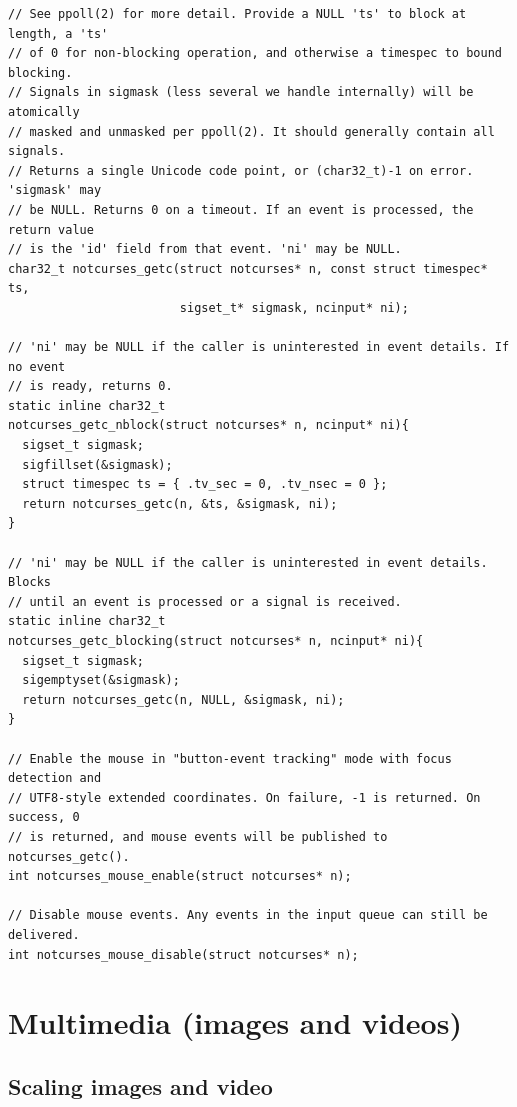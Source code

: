 \documentclass[letterpaper,10pt]{article}
\begin{document}
\begin{listing}[!htbp]
\begin{verbatim}
// See ppoll(2) for more detail. Provide a NULL 'ts' to block at length, a 'ts'
// of 0 for non-blocking operation, and otherwise a timespec to bound blocking.
// Signals in sigmask (less several we handle internally) will be atomically
// masked and unmasked per ppoll(2). It should generally contain all signals.
// Returns a single Unicode code point, or (char32_t)-1 on error. 'sigmask' may
// be NULL. Returns 0 on a timeout. If an event is processed, the return value
// is the 'id' field from that event. 'ni' may be NULL.
char32_t notcurses_getc(struct notcurses* n, const struct timespec* ts,
                        sigset_t* sigmask, ncinput* ni);

// 'ni' may be NULL if the caller is uninterested in event details. If no event
// is ready, returns 0.
static inline char32_t
notcurses_getc_nblock(struct notcurses* n, ncinput* ni){
  sigset_t sigmask;
  sigfillset(&sigmask);
  struct timespec ts = { .tv_sec = 0, .tv_nsec = 0 };
  return notcurses_getc(n, &ts, &sigmask, ni);
}

// 'ni' may be NULL if the caller is uninterested in event details. Blocks
// until an event is processed or a signal is received.
static inline char32_t
notcurses_getc_blocking(struct notcurses* n, ncinput* ni){
  sigset_t sigmask;
  sigemptyset(&sigmask);
  return notcurses_getc(n, NULL, &sigmask, ni);
}

// Enable the mouse in "button-event tracking" mode with focus detection and
// UTF8-style extended coordinates. On failure, -1 is returned. On success, 0
// is returned, and mouse events will be published to notcurses_getc().
int notcurses_mouse_enable(struct notcurses* n);

// Disable mouse events. Any events in the input queue can still be delivered.
int notcurses_mouse_disable(struct notcurses* n);
\end{verbatim}
\end{listing}

\newpage

\section{Multimedia (images and videos)}
\subsection{Scaling images and video}
\end{document}
